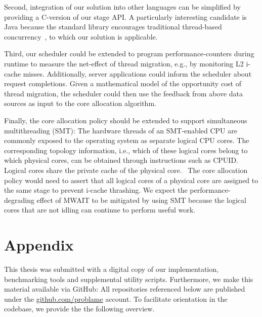 \documentclass[12pt,a4paper]{book}
\begin{document}
Second, integration of our solution into other languages can be simplified by providing a C-version of our stage API.
A particularly interesting candidate is Java because the standard library encourages traditional thread-based concurrency~\cite{javaThreadConcurrency}, to which our solution is applicable.

Third, our scheduler could be extended to program performance-counters during runtime to measure the net-effect of thread migration, e.g., by monitoring L2 i-cache misses.
Additionally, server applications could inform the scheduler about request completions.
Given a mathematical model of the opportunity cost of thread migration, the scheduler could then use the feedback from above data sources as input to the core allocation algorithm.

Finally, the core allocation policy should be extended to support simultaneous multithreading (SMT):
The hardware threads of an SMT-enabled CPU are commonly exposed to the operating system as separate logical CPU cores.
The corresponding topology information, i.e., which of these logical cores belong to which physical cores, can be obtained through instructions such as CPUID.~\cite{intelSDMTopology}
Logical cores share the private cache of the physical core.~\cite{intelSDMHyperthreading}
The core allocation policy would need to assert that all logical cores of a physical core are assigned to the same stage to prevent i-cache thrashing.
We expect the performance-degrading effect of MWAIT to be mitigated by using SMT because the logical cores that are not idling can continue to perform useful work.~\cite{intelSDMHyperthreading}

\backmatter

\chapter{Appendix}\label{ch:appendix}

This thesis was submitted with a digital copy of our implementation, benchmarking tools and supplemental utility scripts.
Furthermore, we make this material available via GitHub:
All repositories referenced below are published under the \url{github.com/problame} account.
To facilitate orientation in the codebase, we provide the the following overview.
\end{document}
